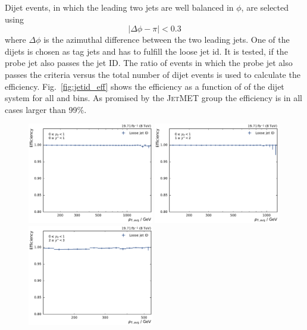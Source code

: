 Dijet events, in which the leading two jets are well balanced in $\phi$, are
selected using
\begin{equation*}
    | \Delta\phi - \pi | < 0.3
\end{equation*}
%
where $\Delta\phi$ is the azimuthal difference between the two leading jets. One of the
dijets is chosen as tag jets and has to fulfill the loose jet id. It is tested,
if the probe jet also passes the jet ID. The ratio of events in which the probe
jet also passes the criteria versus the total number of dijet events is used to
calculate the efficiency. Fig.~\ref{fig:jetid_eff} shows the efficiency as a
function of \ptavg of the dijet system for all \ystar and \yboost bins. As
promised by the \textsc{JetMET} group the efficiency is in all cases larger than
99\%.

\begin{figure}[htbp]
    \centering
    \includegraphics[width=0.49\textwidth]{figures/measurement/jetideff_yb0ys0.pdf}\hfill
    \includegraphics[width=0.49\textwidth]{figures/measurement/jetideff_yb0ys1.pdf}
    \includegraphics[width=0.49\textwidth]{figures/measurement/jetideff_yb0ys2.pdf}\hfill

\end{figure}
